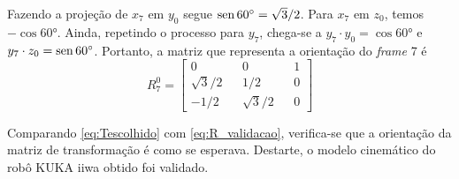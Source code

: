 Fazendo a projeção de $x_7$ em $y_0$ segue $\operatorname{sen} \ang{60} = \sqrt{3}/2$. Para $x_7$ em $z_0$, temos $-\cos \ang{60}$. Ainda, repetindo o processo para $y_7$, chega-se a $y_7 \cdot y_0 = \cos \ang{60}$ e $y_7 \cdot z_0 = \operatorname{sen} \ang{60}$. Portanto, a matriz que representa a orientação do \textit{frame} 7 é
\begin{equation}
    R_7^0 = \left[\begin{array}{rrrrr}
        0 && 0 && 1 \\
         \sqrt{3}/2 && 1/2 && 0 \\
        -1/2 && \sqrt{3}/2 && 0
    \end{array}\right]
    \label{eq:R_validacao}
\end{equation}

Comparando \eqref{eq:Tescolhido} com \eqref{eq:R_validacao}, verifica-se que a orientação da matriz de transformação é como se esperava. Destarte, o modelo cinemático do robô KUKA iiwa obtido foi validado.
